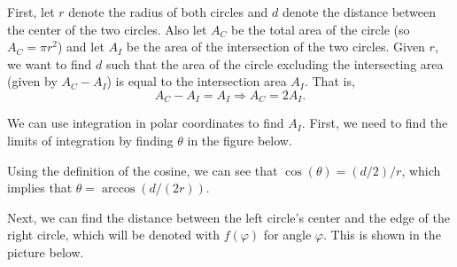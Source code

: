 \documentclass{article}
\def\radius{3cm}
\def\distance{5cm}
\def\appxheight{1.658312cm}
\def\phiheight{0.8284271cm}
\begin{document}
	
First, let $r$ denote the radius of both circles and $d$ denote the distance between the center of the two circles. Also let $A_C$ be the total area of the circle (so $A_C = \pi r^2$) and let $A_I$ be the area of the intersection of the two circles. Given $r$, we want to find $d$ such that the area of the circle excluding the intersecting area (given by $A_C - A_I$) is equal to the intersection area $A_I$. That is,
\begin{equation}
	A_C - A_I = A_I \Rightarrow A_C = 2 A_I.
\end{equation}

We can use integration in polar coordinates to find $A_I$. First, we need to find the limits of integration by finding $\theta$ in the figure below.
\begin{center}
\end{center}
Using the definition of the cosine, we can see that $\cos(\theta) = (d / 2) / r$, which implies that $\theta = \arccos(d / (2r))$.

Next, we can find the distance between the left circle's center and the edge of the right circle, which will be denoted with $f(\varphi)$ for angle $\varphi$. This is shown in the picture below.
\begin{center}
\end{center}
\end{document}
